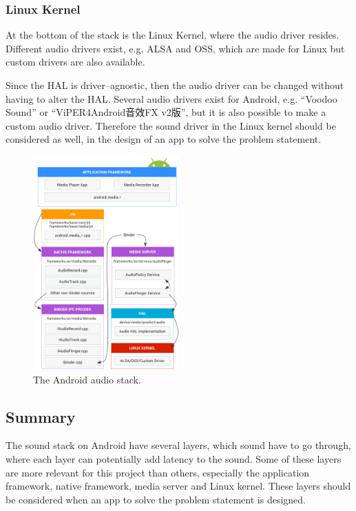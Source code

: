 \subsubsection{Linux Kernel}
At the bottom of the stack is the Linux Kernel, where the audio driver resides.
Different audio drivers exist, e.g. \ac{ALSA} and \ac{OSS}, which are made for Linux but custom drivers are also available.

Since the \ac{HAL} is driver--agnostic, then the audio driver can be changed without having to alter the \ac{HAL}.
Several audio drivers exist for Android, e.g. ``Voodoo Sound'' or ``ViPER4Android音效FX v2版'',
but it is also possible to make a custom audio driver\cite{voodoo_sound}\cite{viper4_android}.
Therefore the sound driver in the Linux kernel should be considered as well, in the design of an app to solve the problem statement.
\begin{figure}[!bht]
    \centering
    \includegraphics[width=0.5\textwidth]{img/sound_stack.png}
    \caption{The Android audio stack\cite{sound_stack}.}
    \label{fig:sound_stack}
\end{figure}

\subsection{Summary}
The sound stack on Android have several layers, which sound have to go through,
where each layer can potentially add latency to the sound.
Some of these layers are more relevant for this project than others,
especially the application framework, native framework, media server and Linux kernel.
These layers should be considered when an app to solve the problem statement is designed.


